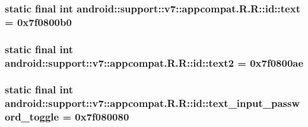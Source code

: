 \hypertarget{classandroid_1_1support_1_1v7_1_1appcompat_1_1_r_1_1id_dd3b93e3e5bc8592e4307ae6ea24e957}{
\subsubsection[{text}]{\setlength{\rightskip}{0pt plus 5cm}static final int android::support::v7::appcompat.R.R::id::text = 0x7f0800b0}}
\label{classandroid_1_1support_1_1v7_1_1appcompat_1_1_r_1_1id_dd3b93e3e5bc8592e4307ae6ea24e957}


\hypertarget{classandroid_1_1support_1_1v7_1_1appcompat_1_1_r_1_1id_f92a3e51ca4996afd616f83677acca5d}{
\subsubsection[{text2}]{\setlength{\rightskip}{0pt plus 5cm}static final int android::support::v7::appcompat.R.R::id::text2 = 0x7f0800ae}}
\label{classandroid_1_1support_1_1v7_1_1appcompat_1_1_r_1_1id_f92a3e51ca4996afd616f83677acca5d}


\hypertarget{classandroid_1_1support_1_1v7_1_1appcompat_1_1_r_1_1id_e259ceee8b66a9c76b1679520721cbf9}{
\subsubsection[{text\_\-input\_\-password\_\-toggle}]{\setlength{\rightskip}{0pt plus 5cm}static final int android::support::v7::appcompat.R.R::id::text\_\-input\_\-password\_\-toggle = 0x7f080080}}
\label{classandroid_1_1support_1_1v7_1_1appcompat_1_1_r_1_1id_e259ceee8b66a9c76b1679520721cbf9}


